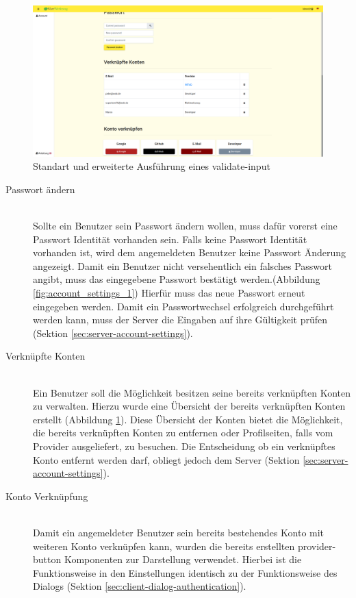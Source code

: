 \begin{figure}
	\centering
	\includegraphics[width=\textwidth]{graphics/account-settings-2.png}
	\caption{Standart und erweiterte Ausführung eines validate-input}
	\label{fig:account_settings_2}
\end{figure}

\begin{description}
	\item[Passwort ändern]\hfill\\
	Sollte ein Benutzer sein Passwort ändern wollen, muss dafür vorerst eine Passwort Identität vorhanden sein. Falls keine Passwort Identität vorhanden ist, wird dem angemeldeten Benutzer keine Passwort Änderung angezeigt. Damit ein Benutzer nicht versehentlich ein falsches Passwort angibt, muss das eingegebene Passwort bestätigt werden.(Abbildung \ref{fig:account_settings_1}) Hierfür muss das neue Passwort erneut eingegeben werden. Damit ein Passwortwechsel erfolgreich durchgeführt werden kann, muss der Server die Eingaben auf ihre Gültigkeit prüfen (Sektion \ref{sec:server-account-settings}).
	\item[Verknüpfte Konten]\hfill\\
	Ein Benutzer soll die Möglichkeit besitzen seine bereits verknüpften Konten zu verwalten. Hierzu wurde eine Übersicht der bereits verknüpften Konten erstellt (Abbildung \ref{fig:account_settings_2}). Diese Übersicht der Konten bietet die Möglichkeit, die bereits verknüpften Konten zu entfernen oder Profilseiten, falls vom Provider ausgeliefert, zu besuchen. Die Entscheidung ob ein verknüpftes Konto entfernt werden darf, obliegt jedoch dem Server (Sektion \ref{sec:server-account-settings}).
	\item[Konto Verknüpfung]\hfill\\
	Damit ein angemeldeter Benutzer sein bereits bestehendes Konto mit weiteren Konto verknüpfen kann, wurden die bereits erstellten provider-button Komponenten zur Darstellung verwendet. Hierbei ist die Funktionsweise in den Einstellungen identisch zu der Funktionsweise des Dialogs (Sektion \ref{sec:client-dialog-authentication}).
\end{description}

